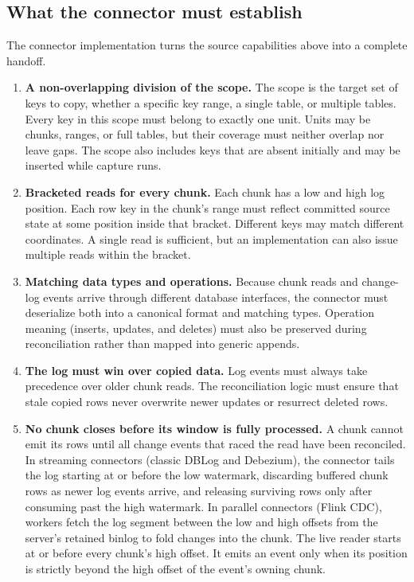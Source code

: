 \documentclass[sigconf,nonacm,10pt]{acmart}
\theoremstyle{plain}
\theoremstyle{definition}
\begin{document}
\subsection{What the connector must establish}
\label{sec:practitioner-implementation}

The connector implementation turns the source capabilities above into a complete handoff.

\begin{enumerate}
\item \textbf{A non-overlapping division of the scope.} The scope is 
the target set of keys to copy, whether a specific key range, a single 
table, or multiple tables. Every key in this scope must belong to exactly 
one unit. Units may be chunks, ranges, or full tables, but their coverage 
must neither overlap nor leave gaps. The scope also includes keys that 
are absent initially and may be inserted while capture runs.

\item \textbf{Bracketed reads for every chunk.} Each chunk has a low and
high log position. Each row key in the chunk's range must reflect committed
source state at some position inside that bracket. Different keys may match
different coordinates. A single read is sufficient, but an implementation 
can also issue multiple reads within the bracket.

\item \textbf{Matching data types and operations.} Because chunk reads 
and change-log events arrive through different database interfaces, the 
connector must deserialize both into a canonical format and matching types.
Operation meaning (inserts, updates, and deletes) must also be preserved 
during reconciliation rather than mapped into generic appends.

\item \textbf{The log must win over copied data.} Log events must always 
take precedence over older chunk reads. The reconciliation logic must ensure 
that stale copied rows never overwrite newer updates or resurrect deleted rows.

\item \textbf{No chunk closes before its window is fully processed.}
A chunk cannot emit its rows until all change events that raced the read have 
been reconciled. In streaming connectors (classic DBLog and Debezium), the 
connector tails the log starting at or before the low watermark, discarding 
buffered chunk rows as newer log events arrive, and releasing surviving 
rows only after consuming past the high watermark. In parallel connectors 
(Flink CDC), workers fetch the log segment between the low and high offsets
from the server's retained binlog to fold changes into the chunk. The live reader starts 
at or before every chunk's high offset. It emits an event only when its 
position is strictly beyond the high offset of the event's owning chunk.


\end{enumerate}
\end{document}
